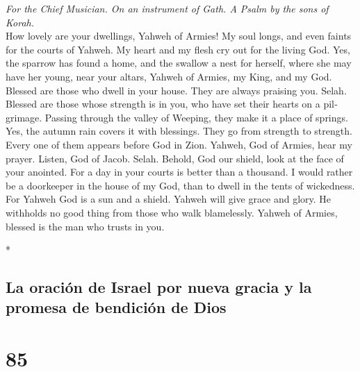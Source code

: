 \begin{paracol}{2}
\begin{otherlanguage}{english}
\emph{For the Chief Musician. On an instrument of Gath. A Psalm by the
sons of Korah.}\\
 How lovely are your dwellings, Yahweh of Armies!
 My soul longs, and even faints for the courts of Yahweh.
My heart and my flesh cry out for the living God.  Yes,
the sparrow has found a home, and the swallow a nest for herself, where
she may have her young, near your altars, Yahweh of Armies, my King, and
my God.  Blessed are those who dwell in your house. They
are always praising you. Selah.  Blessed are those whose
strength is in you, who have set their hearts on a pilgrimage.
 Passing through the valley of Weeping, they make it a
place of springs. Yes, the autumn rain covers it with blessings.
 They go from strength to strength. Every one of them
appears before God in Zion.  Yahweh, God of Armies, hear
my prayer. Listen, God of Jacob. Selah.  Behold, God our
shield, look at the face of your anointed.  For a day in
your courts is better than a thousand. I would rather be a doorkeeper in
the house of my God, than to dwell in the tents of wickedness.
 For Yahweh God is a sun and a shield. Yahweh will give
grace and glory. He withholds no good thing from those who walk
blamelessly.  Yahweh of Armies, blessed is the man who
trusts in you.

\end{otherlanguage}

\switchcolumn[0]*

\hypertarget{la-oraciuxf3n-de-israel-por-nueva-gracia-y-la-promesa-de-bendiciuxf3n-de-dios}{%
\subsection{La oración de Israel por nueva gracia y la promesa de
bendición de
Dios}\label{la-oraciuxf3n-de-israel-por-nueva-gracia-y-la-promesa-de-bendiciuxf3n-de-dios}}

\hypertarget{section-168}{%
\section{85}\label{section-168}}


\end{paracol}
